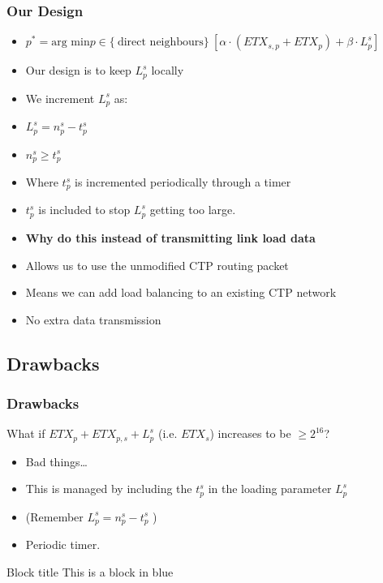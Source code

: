 \documentclass{beamer}
\begin{document}
\begin{frame}
  \frametitle{Our Design}
  \begin{itemize}
    \item $p^* = \text{arg min}  p \in \{\ \text{direct neighbours} \}\
      [\alpha  \cdot (ETX_{s,p} + ETX_p) + \beta \cdot L_p^s]$

    \item Our design is to keep $L_p^s$ locally 
    \item We increment $L_p^s$ as:
    \item $L_p^s = n_p^s - t_p^s$
    \item $n_p^s \geq t_p^s$
    \item Where $t_p^s$ is incremented periodically through a timer
    \item $t_p^s$ is included to stop $L_p^s$ getting too large.
    \item \textbf{Why do this instead of transmitting link load data}
    \item Allows us to use the unmodified CTP routing packet
    \item Means we can add load balancing to an existing CTP network
    \item No extra data transmission
  \end{itemize}

\end{frame}

\subsection{Drawbacks}

\begin{frame}
  \frametitle{Drawbacks}
    What if $ETX_p + ETX_{p,s} + L_p^s$ (i.e. $ETX_s$) increases to be $\geq 2^{16}$?
  \begin{itemize}
    \item Bad things\ldots
    \item This is managed by including the $t_p^s$ in the loading parameter
    $L_p^s$
    \item (Remember $L_p^s = n_p^s - t_p^s$ )
    \item Periodic timer.
  \end{itemize}

  \begin{block}{Block title}
  This is a block in blue
  \end{block}

\end{frame}  
\end{document}
